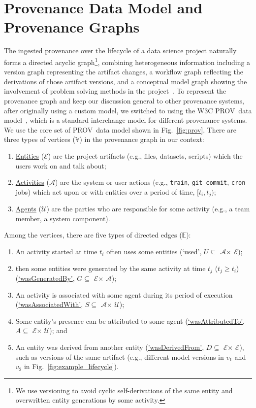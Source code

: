 \documentclass[11pt]{article}
\newcommand{\prov}{{\sc PROV}\xspace}
\newcommand{\cmd}[1]{{\tt #1}}
\newcommand{\vertexset}{$\mathbb V$}
\newcommand{\edgeset}{$\mathbb E$}
\newcommand{\entity}{$\mathcal E$}
\newcommand{\activity}{$\mathcal A$}
\newcommand{\agent}{$\mathcal U$}
\newcommand{\used}{$\mathit U$}
\newcommand{\wasGeneratedBy}{$\mathit G$}
\newcommand{\wasAssociatedWith}{$\mathit S$}
\newcommand{\wasAttributedTo}{$\mathit A$}
\newcommand{\wasDerivedFrom}{$\mathit D$}
\begin{document}
\section{Provenance Data Model and Provenance Graphs}
\label{sec:model}
The ingested provenance over the lifecycle of a data science project naturally forms a directed acyclic graph\footnote{We use versioning to avoid cyclic
self-derivations of the same entity and overwritten entity generations by some activity.}, combining heterogeneous information including a version graph representing the artifact changes, a workflow graph reflecting the derivations of those artifact versions, and a conceptual model graph showing the involvement of problem solving methods in the project~\cite{ground@cidr17,provdb@hilda17}. 
To represent the provenance graph and keep our discussion general to other provenance systems, after originally using a custom model, we switched to using the W3C \prov\ data model~\cite{prov_dm@w3c_tr13}, which is a standard interchange model for different provenance systems. 
We use the core set of \prov\ data model shown in Fig.~\ref{fig:prov}. 
There are three types of vertices (\vertexset) in the provenance graph in our context:
\begin{enumerate}[leftmargin=18pt,label=\emph{\alph*})]{}
\item 
\ul{Entities} (\entity) are the project artifacts (e.g., files, datasets, scripts) which the users work on and talk about; 
\item
\ul{Activities} (\activity) are the system or user actions (e.g., \cmd{train}, \cmd{git commit}, \cmd{cron} jobs) which act upon or with entities over a period of time, $[t_i, t_j)$; 
\item
\ul{Agents} (\agent) are the parties who are responsible for some activity (e.g., a team member, a system component). 
\end{enumerate}
Among the vertices, there are five types of directed edges (\edgeset): 
\begin{enumerate}[leftmargin=18pt,label={\roman*})]{}
\item    
An activity started at time $t_i$ often uses some entities (\ul{`used'}, \used $\subseteq$ \activity $\times$ \entity);  
\item
then some entities were generated by the same activity at time $t_j$ ($t_j \geq t_i$) (\ul{`wasGeneratedBy'}, \wasGeneratedBy $\subseteq$ \entity $\times$ \activity); 
\item
An activity is associated with some agent during its period of execution (\ul{`wasAssociatedWith'}, \wasAssociatedWith $\subseteq$ \activity $\times$ \agent);
\item
Some entity's presence can be attributed to some agent (\ul{`wasAttributedTo'}, \wasAttributedTo $\subseteq$
    \entity $\times$ \agent); and 
\item
An entity was derived from another entity (\ul{'wasDerivedFrom'}, \wasDerivedFrom $\subseteq$ \entity $\times$ \entity), such as versions of the same artifact (e.g.,
    different model versions in $v_1$ and $v_2$ in Fig.~\ref{fig:example_lifecycle}). 
\end{enumerate}    
\end{document}
